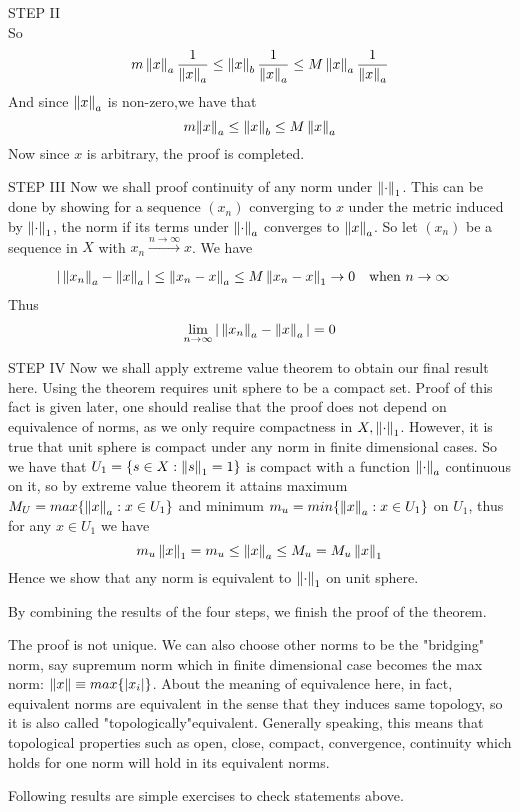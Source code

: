 \documentclass{article}
\begin{document}
\begin{theorem}
\begin{pf}{STEP II}{}
$$		$$
		So
		$$
			m\left\|{x}\right\|_a\frac{1}{\left\|{x}\right\|_a}\leq \left\|{x}\right\|_b\frac{1}{\left\|{x}\right\|_a}\leq M\left\|{x}\right\|_a\frac{1}{\left\|{x}\right\|_a}
		$$
		And since ${\left\|{x}\right\|_a}$ is non-zero,we have that
		$$
			m{\left\|{x}\right\|_a}\leq \left\|{x}\right\|_b\leq M\left\|{x}\right\|_a
		$$
		Now since $x$ is arbitrary, the proof is completed.	
	\end{pf}
	\begin{pf}{STEP III}{}
		Now we shall proof continuity of any norm under $\left\|{\cdot}\right\| _1$. This can be done by showing for a sequence $(x_n)$ converging to $x$ under the metric induced by $\left\|{\cdot}\right\|_1$, the norm if its terms under $\left\|{\cdot}\right\|_a$ converges to $\left\|{x}\right\|_a$. So let $(x_n)$ be a sequence in $X$ with $x_n\xrightarrow[]{n\to \infty}x$. We have
		\begin{equation}
			\begin{split}\nonumber
				|\left\|{x_n}\right\|_a-\left\|{x}\right\|_a|&\leq\left\|{x_n-x}\right\|_a\leq M\left\|{x_n-x}\right\|_1\to0\quad \text{when}\,\,n\to\infty
			\end{split}
		\end{equation}
		Thus
		$$
			\lim_{n\to\infty}|\left\|{x_n}\right\|_a-\left\|{x}\right\|_a|=0
		$$
	\end{pf}
\begin{pf}{STEP IV}{}
	Now we shall apply extreme value theorem to obtain our final result here. Using the theorem requires unit sphere to be a compact set. Proof of this fact is given later, one should realise that the proof does not depend on equivalence of norms, as we only require compactness in $X,\left\|{\cdot}\right\|_1$. However, it is true that unit sphere is compact under any norm in finite dimensional cases. So we have that $U_1=\{s\in X:\left\|{s}\right\|_1=1\}$ is compact with  a  function $\left\|{\cdot}\right\|_a$ continuous on it, so by extreme value theorem it attains maximum $M_U=max\{\left\|{x}\right\|_a:x\in U_1\}$ and minimum $m_u=min\{\left\|{x}\right\|_a:x\in U_1\}$ on $U_1$, thus for any $x\in U_1$ we have
	$$
		m_u \left\|{x}\right\|_1=m_u\leq\left\|{x}\right\|_a\leq M_u=M_u \left\|{x}\right\|_1
	$$
	Hence we show that any norm is equivalent to $\left\|{\cdot}\right\|_1$ on unit sphere.
\end{pf}
By combining the results of the four steps, we finish the proof of the theorem.
\end{theorem}

\begin{remark}\rm\nextline
	The proof is not unique. We can also choose other norms to be the "bridging" norm, say supremum norm which in finite dimensional case becomes the max norm: $\left\|{x}\right\|\equiv max\{|x_i|\}$. About the meaning of equivalence here, in fact, equivalent norms are equivalent in the sense that they induces same topology, so it is also called "topologically"equivalent. Generally speaking, this means that topological properties such as open, close, compact, convergence, continuity which holds for one norm will hold in its equivalent norms.
\end{remark}
Following results are simple exercises to check statements above.
\end{document}
